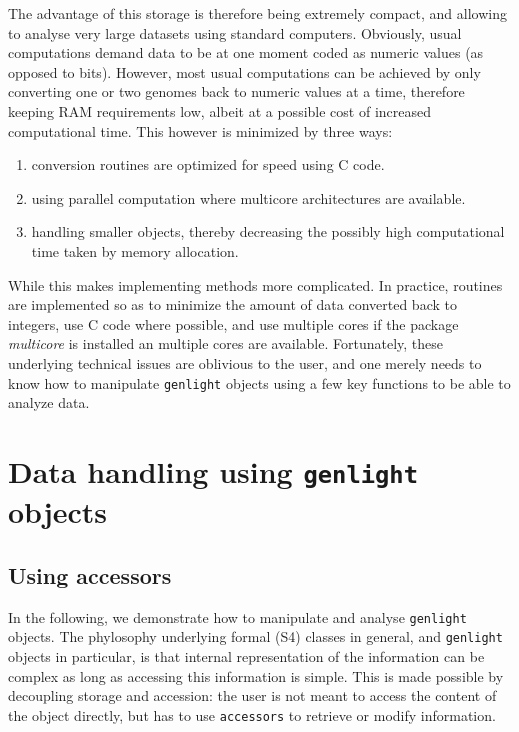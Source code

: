 \documentclass{article}
\begin{document}
The advantage of this storage is therefore being extremely compact, and allowing to analyse very large
datasets using standard computers.
Obviously, usual computations demand data to be at one moment coded as numeric values (as opposed to bits).
However, most usual computations can be achieved by only converting one or two genomes back to numeric values
at a time, therefore keeping RAM requirements low, albeit at a possible cost of increased computational time.
This however is minimized by three ways:
\begin{enumerate}
\item conversion routines are optimized for speed using C code.
\item using parallel computation where multicore architectures are available.
\item handling smaller objects, thereby decreasing the possibly high computational time taken by memory allocation.
\end{enumerate}

While this makes implementing methods more complicated.
In practice, routines are implemented so as to minimize
the amount of data converted back to integers, use C code where possible, and use multiple cores
if the package \textit{multicore} is installed an multiple cores are available.
Fortunately, these underlying technical issues are oblivious to the user, and one merely needs to
know how to manipulate \texttt{genlight} objects using a few key functions to be able to analyze data.






\section{Data handling using \texttt{genlight} objects}

\subsection{Using accessors}

In the following, we demonstrate how to manipulate and analyse \texttt{genlight} objects.
The phylosophy underlying formal (S4) classes in general, and \texttt{genlight} objects in
particular, is that internal representation of the information can be complex as long as accessing
this information is simple.
This is made possible by decoupling storage and accession: the user is not meant to access the
content of the object directly, but has to use \texttt{accessors} to retrieve or modify information.
\\
\end{document}
